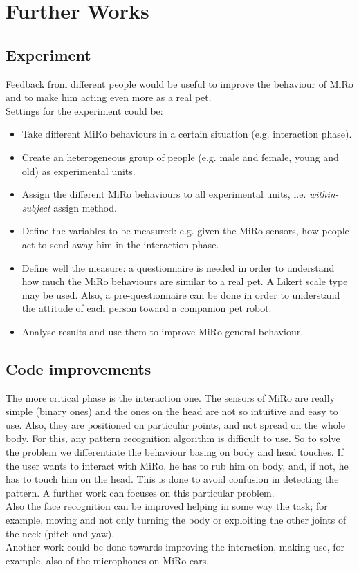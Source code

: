 \documentclass[12pt,peerreviewca, a4paper, onecolumn]{article}
\begin{document}
	\section{Further Works}
	\subsection{Experiment}
	Feedback from different people would be useful to improve the behaviour of MiRo and to make him acting even more as a real pet.\\
	Settings for the experiment could be:
	\begin{itemize}
		\item Take different MiRo behaviours in a certain situation (e.g. interaction phase).
		\vspace{-6px}
		\item Create an heterogeneous group of people (e.g. male and female, young and old) as experimental units.
		\vspace{-6px}
		\item Assign the different MiRo behaviours to all experimental units, i.e. \textit{within-subject} assign method.
		\vspace{-6px}
		\item Define the variables to be measured: e.g. given the MiRo sensors, how people act to send away him in the interaction phase.
		\vspace{-6px}
		\item Define well the measure: a questionnaire is needed in order to understand how much the MiRo behaviours are similar to a real pet. A Likert scale type may be used. Also, a pre-questionnaire can be done in order to understand the attitude of each person toward a companion pet robot.
		\vspace{-6px}
		\item Analyse results and use them to improve MiRo general behaviour.
	\end{itemize}
	
	
	
	\subsection{Code improvements}
	The more critical phase is the interaction one. The sensors of MiRo are really simple (binary ones) and the ones on the head are not so intuitive and easy to use. Also, they are positioned on particular points, and not spread on the whole body. For this, any pattern recognition algorithm is difficult to use. So to solve the problem we differentiate the behaviour basing on body and head touches. If the user wants to interact with MiRo, he has to rub him on body, and, if not, he has to touch him on the head. This is done to avoid confusion in detecting the pattern. A further work can focuses on this particular problem.\\
	Also the face recognition can be improved helping in some way the task; for example, moving and not only turning the body or exploiting the other joints of the neck (pitch and yaw).\\
	Another work could be done towards improving the interaction, making use, for example, also of the microphones on MiRo ears.
 
	 
		

	
\end{document}
